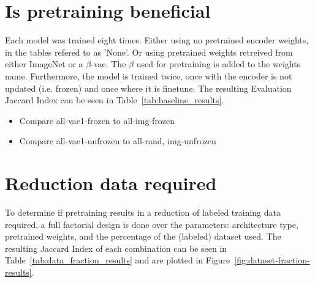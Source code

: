 \section{Is pretraining beneficial}
Each model was trained eight times. Either using no pretrained encoder weights, in the tables refered to as 'None'. Or using pretrained weights retreived from either ImageNet \cite{deng2009imagenet} or a $\beta$-vae. The $\beta$ used for pretraining is added to the weights name. Furthermore, the model is trained twice, once with the encoder is not updated (i.e. frozen) and once where it is finetune. The resulting Evaluation Jaccard Index can be seen in Table~\ref{tab:baseline_results}.



\begin{itemize}
    \item Compare {all}-vae1-frozen to {all}-img-frozen
    \item Compare {all}-vae1-unfrozen to {all}-{rand, img}-unfrozen
\end{itemize}



\section{Reduction data required}
To determine if pretraining results in a reduction of labeled training data required, a full factorial design is done over the parameters: architecture type, pretrained weights, and the percentage of the (labeled) dataset used. The resulting Jaccard Index of each combination can be seen in Table~\ref{tab:data_fraction_results} and are plotted in Figure~\ref{fig:dataset-fraction-results}.


